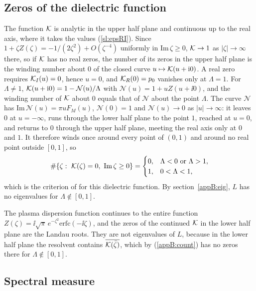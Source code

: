 \subsection{Zeros of the dielectric function}\label{appB:penrose}

The function $\mathcal K$ is analytic in the upper half plane and continuous up to the real axis, where it takes the values (\ref{sl:epsRI}). Since $1+\zeta Z(\zeta)=-1/(2\zeta^2)+O(\zeta^{-4})$ uniformly in $\mathrm{Im}\,\zeta\ge0$, $\mathcal K\to1$ as $|\zeta|\to\infty$ there, so if $\mathcal K$ has no real zeros, the number of its zeros in the upper half plane is the winding number about $0$ of the closed curve $u\mapsto\mathcal K(u+\mathrm{i}0)$. A real zero requires $\mathcal K_I(u)=0$, hence $u=0$, and $\mathcal K_R(0)=p_0$ vanishes only at $\Lambda=1$. For $\Lambda\neq1$, $\mathcal K(u+\mathrm{i}0)=1-\mathcal N(u)/\Lambda$ with $\mathcal N(u)=1+uZ(u+\ii0)$, and the winding number of $\mathcal K$ about $0$ equals that of $\mathcal N$ about the point $\Lambda$. The curve $\mathcal N$ has $\mathrm{Im}\,\mathcal N(u)=\pi uF_M(u)$, $\mathcal N(0)=1$ and $\mathcal N(u)\to0$ as $|u|\to\infty$: it leaves $0$ at $u=-\infty$, runs through the lower half plane to the point $1$, reached at $u=0$, and returns to $0$ through the upper half plane, meeting the real axis only at $0$ and $1$. It therefore winds once around every point of $(0,1)$ and around no real point outside $[0,1]$, so
\begin{equation}\label{appB:count}
  \#\{\zeta:\ \mathcal K(\zeta)=0,\ \mathrm{Im}\,\zeta\ge0\}=
  \begin{cases}0, & \Lambda<0\ \text{or}\ \Lambda>1,\\ 1, & 0<\Lambda<1,\end{cases}
\end{equation}
which is the criterion of \citet{Penrose1960} for this dielectric function. By section~\ref{appB:eig}, $L$ has no eigenvalues for $\Lambda\notin[0,1]$.

The plasma dispersion function continues to the entire function $Z(\zeta)=\ii\sqrt\pi\,e^{-\zeta^2}\mathrm{erfc}(-\ii\zeta)$, and the zeros of the continued $\mathcal K$ in the lower half plane are the Landau roots. They are not eigenvalues of $L$, because in the lower half plane the resolvent contains $\overline{\mathcal K(\bar\zeta)}$, which by (\ref{appB:count}) has no zeros there for $\Lambda\notin[0,1]$.

\subsection{Spectral measure}\label{appB:stone}

